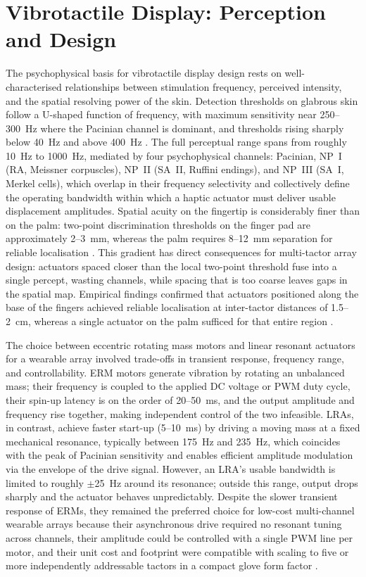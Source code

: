 \documentclass[12pt, a4paper]{report}
\begin{document}
\section{Vibrotactile Display: Perception and Design}
The psychophysical basis for vibrotactile display design rests on well-characterised relationships between stimulation frequency, perceived intensity, and the spatial resolving power of the skin. Detection thresholds on glabrous skin follow a U-shaped function of frequency, with maximum sensitivity near 250--300~Hz where the Pacinian channel is dominant, and thresholds rising sharply below 40~Hz and above 400~Hz \cite{verrillo1985}. The full perceptual range spans from roughly 10~Hz to 1000~Hz, mediated by four psychophysical channels: Pacinian, NP~I (RA, Meissner corpuscles), NP~II (SA~II, Ruffini endings), and NP~III (SA~I, Merkel cells), which overlap in their frequency selectivity and collectively define the operating bandwidth within which a haptic actuator must deliver usable displacement amplitudes. Spatial acuity on the fingertip is considerably finer than on the palm: two-point discrimination thresholds on the finger pad are approximately 2--3~mm, whereas the palm requires 8--12~mm separation for reliable localisation \cite{johansson2009}. %
This gradient has direct consequences for multi-tactor array design: actuators spaced closer than the local two-point threshold fuse into a single percept, wasting channels, while spacing that is too coarse leaves gaps in the spatial map. Empirical findings confirmed that actuators positioned along the base of the fingers achieved reliable localisation at inter-tactor distances of 1.5--2~cm, whereas a single actuator on the palm sufficed for that entire region \cite{vechev2019}.

The choice between eccentric rotating mass motors and linear resonant actuators for a wearable array involved trade-offs in transient response, frequency range, and controllability. ERM motors generate vibration by rotating an unbalanced mass; their frequency is coupled to the applied DC voltage or PWM duty cycle, their spin-up latency is on the order of 20--50~ms, and the output amplitude and frequency rise together, making independent control of the two infeasible. LRAs, in contrast, achieve faster start-up (5--10~ms) by driving a moving mass at a fixed mechanical resonance, typically between 175~Hz and 235~Hz, which coincides with the peak of Pacinian sensitivity and enables efficient amplitude modulation via the envelope of the drive signal. However, an LRA's usable bandwidth is limited to roughly $\pm$25~Hz around its resonance; outside this range, output drops sharply and the actuator behaves unpredictably. Despite the slower transient response of ERMs, they remained the preferred choice for low-cost multi-channel wearable arrays because their asynchronous drive required no resonant tuning across channels, their amplitude could be controlled with a single PWM line per motor, and their unit cost and footprint were compatible with scaling to five or more independently addressable tactors in a compact glove form factor \cite{pacchierotti2017}.
\end{document}
